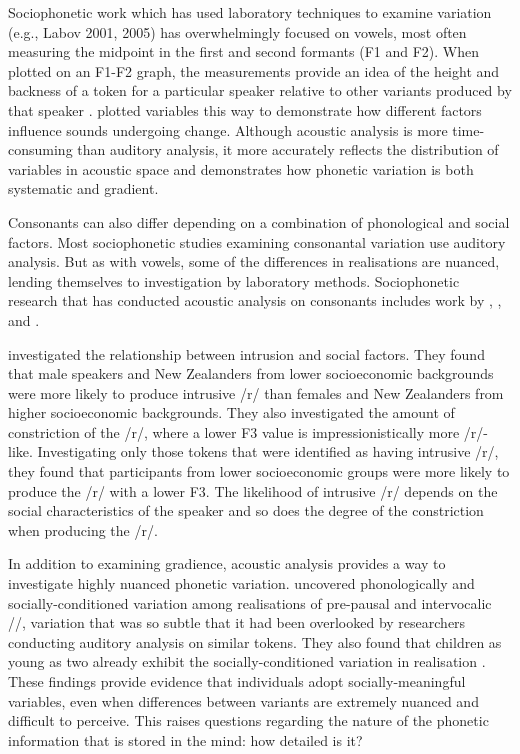Sociophonetic work which has used laboratory techniques to examine variation (e.g., Labov 2001, 2005) has overwhelmingly focused on vowels, most often measuring the midpoint in the first and second formants (F1 and F2).  When plotted on an F1-F2 graph, the measurements provide an idea of the height and backness of a token for a particular speaker relative to other variants produced by that speaker \cite[182-184]{petersonbarney1952}.   plotted variables this way to demonstrate how different factors influence sounds undergoing change.  Although acoustic analysis is more time-consuming than auditory analysis, it more accurately reflects the distribution of variables in acoustic space and demonstrates how phonetic variation is both systematic and gradient.  \nocite{labov2005} \nocite{labov2005}

Consonants can also differ depending on a combination of phonological and social factors.  Most sociophonetic studies examining consonantal variation use auditory analysis.  But as with vowels, some of the differences in realisations are nuanced, lending themselves to investigation by laboratory methods.  Sociophonetic research that has conducted acoustic analysis on consonants includes work by ,  , and .

 investigated the relationship between  intrusion and social factors.  They found that male speakers and New Zealanders from lower socioeconomic backgrounds were more likely to produce intrusive /r/ than females and New Zealanders from higher socioeconomic backgrounds.  They also investigated the amount of constriction of the /r/, where a lower F3 value is impressionistically more /r/-like.  Investigating only those tokens that were identified as having intrusive /r/, they found that participants from lower socioeconomic groups were more likely to produce the /r/ with a lower F3.  The likelihood of intrusive /r/ depends on the social characteristics of the speaker and so does the degree of the constriction when producing the /r/.  

In addition to examining gradience, acoustic analysis provides a way to investigate highly nuanced phonetic variation.   uncovered phonologically and so\-cially-condi\-tioned variation among realisations of pre-pausal and intervocalic //, variation that was so subtle that it had been overlooked by researchers conducting auditory analysis on similar tokens.  They also found that children as young as two already exhibit the socially-conditioned variation in  realisation \cite{foulkesdochertywatt2005}. These findings provide evidence that individuals adopt socially-meaningful variables, even when differences between variants are extremely nuanced and difficult to perceive.  This raises questions regarding the nature of the phonetic information that is stored in the mind: how detailed is it?

